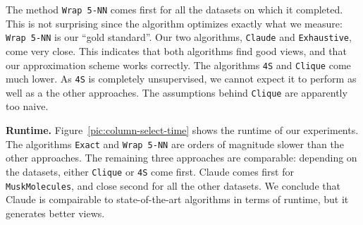 The method \texttt{Wrap 5-NN} comes first for all the datasets on which it
completed. This is not surprising since the algorithm optimizes exactly what we
measure: \texttt{Wrap 5-NN} is our ``gold standard''. Our two algorithms,
\texttt{Claude} and \texttt{Exhaustive}, come very close. This indicates that
both algorithms find good views, and that our approximation scheme works
correctly.  The algorithms \texttt{4S} and \texttt{Clique} come much lower. As
\texttt{4S} is completely unsupervised, we cannot expect it to perform as well
as a the other approaches. The assumptions behind \texttt{Clique} are
apparently too naive.

\textbf{Runtime.} Figure~\ref{pic:column-select-time} shows the runtime of our
experiments. The algorithms \texttt{Exact} and \texttt{Wrap 5-NN} are orders of
magnitude slower than the other approaches. The remaining three approaches are
comparable: depending on the datasets, either \texttt{Clique} or \texttt{4S}
come first. Claude comes first for \texttt{MuskMolecules}, and close
second for all the other datasets. We conclude that Claude is compairable to
state-of-the-art algorithms in terms of runtime, but it generates better views.

